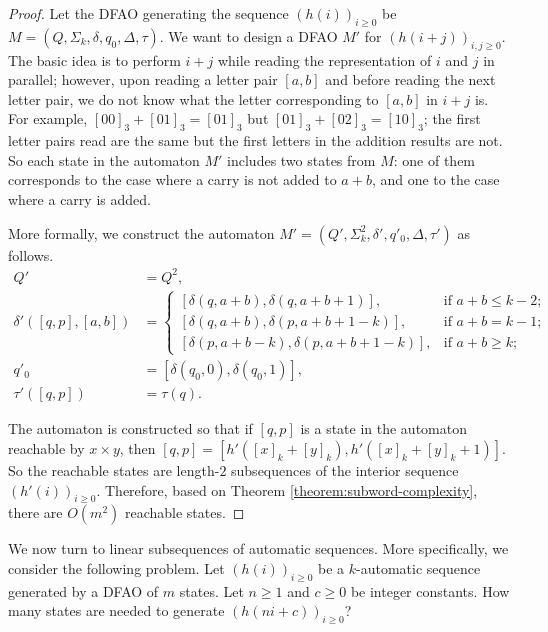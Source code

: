\documentclass[12pt,reqno]{article}
\begin{document}
\begin{proof}
    Let the DFAO generating the sequence $(h(i))_{i \geq 0}$ be $M=(Q, \Sigma_k, \delta, q_0, \Delta, \tau)$. We want to design a DFAO $M'$ for $(h(i+j))_{i, j \geq 0}$. The basic idea is to perform $i+j$ while reading the representation of $i$ and $j$ in parallel; however, upon reading a letter pair $[a, b]$ and before reading the next letter pair, we do not know what the letter corresponding to $[a, b]$ in $i+j$ is. For example, $[00]_3 + [01]_3 = [01]_3$ but $[01]_3 + [02]_3 = [10]_3$; the first letter pairs read are the same but the first letters in the addition results are not. So each state in the automaton $M'$ includes two states from $M$: one of them corresponds to the case where a carry is not added to $a+b$, and one to the case where a carry is added.

    More formally, we construct the automaton $M'=(Q', \Sigma_k^2, \delta', q'_0, \Delta, \tau')$ as follows.
    \begin{align*}
    Q' &= Q^2, \\
    \delta'([q, p], [a, b]) &=
    \begin{cases}
        [\delta(q, a+b), \delta (q, a+b+1)], &  \text{if $a+ b \leq k-2$}; \\
        [\delta(q, a+b), \delta(p, a+b+1-k)], &  \text{if $a+b = k-1$}; \\
        [\delta(p, a+b-k), \delta(p, a+b+1-k)], & \text{if $a+b \geq k$;}
    \end{cases}
     \\
    q'_0 &= [\delta(q_0, 0), \delta(q_0, 1)], \\
    \tau'([q, p]) &= \tau(q).
    \end{align*}


The automaton is constructed so that if $[q, p]$ is a state in the automaton reachable by $x \times y$, then $[q, p] = [h'([x]_k+[y]_k), h'([x]_k+[y]_k+1)]$. So the reachable states are length-$2$ subsequences of the interior sequence $(h'(i))_{i \geq 0}$. Therefore, based on Theorem \ref{theorem:subword-complexity}, there are $O(m^2)$ reachable states.
\end{proof}

We now turn to linear subsequences of automatic sequences.  More specifically, we consider the following problem.  Let $(h(i))_{i \geq 0}$ be a $k$-automatic sequence generated by a DFAO of $m$ states.  Let $n \geq 1$ and $c \geq 0$ be integer constants.  How many states are needed to generate 
$(h(ni+c))_{i \geq 0}$?
\end{document}
